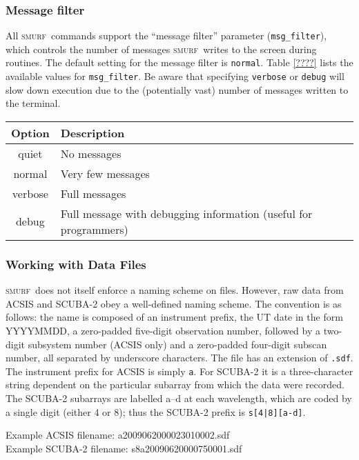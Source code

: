 \documentclass[twoside,11pt]{article}
\renewcommand{\_}{\texttt{\symbol{95}}}
\newcommand{\SMURF}{\textsc{smurf}}
\begin{document}
\subsubsection{Message filter}

All \SMURF\ commands support the ``message filter'' parameter
(\verb+msg_filter+), which controls the number of messages \SMURF\
writes to the screen during routines. The default setting for the
message filter is \verb+normal+. Table \ref{????}  lists the available
values for \verb+msg_filter+. Be aware that specifying \verb+verbose+
or \verb+debug+ will slow down execution due to the (potentially vast)
number of messages written to the terminal.

\begin{table}
\begin{tabular}{|c|l|}
\hline
Option  & Description \\
\hline
quiet   & No messages \\
normal  & Very few messages \\
verbose & Full messages \\
debug   & Full message with debugging information (useful for programmers) \\
\hline
\end{tabular}
\end{table}

\subsubsection{Working with Data Files}

\SMURF\ does not itself enforce a naming scheme on files. However, raw
data from ACSIS and SCUBA-2 obey a well-defined naming scheme. The
convention is as follows: the name is composed of an instrument
prefix, the UT date in the form YYYYMMDD, a zero-padded five-digit
observation number, followed by a two-digit subsystem number (ACSIS
only) and a zero-padded four-digit subscan number, all separated by
underscore characters. The file has an extension of \verb+.sdf+. The
instrument prefix for ACSIS is simply \verb+a+. For SCUBA-2 it is a
three-character string dependent on the particular subarray from which
the data were recorded. The SCUBA-2 subarrays are labelled a--d at
each wavelength, which are coded by a single digit (either 4 or 8);
thus the SCUBA-2 prefix is \verb+s[4|8][a-d]+.

Example ACSIS filename: a20090620\_00023\_01\_0002.sdf\\
Example SCUBA-2 filename: s8a20090620\_00075\_0001.sdf
\end{document}
